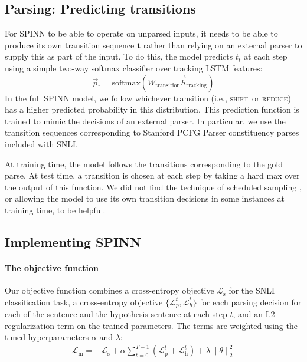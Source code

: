 \documentclass[11pt]{article}
\newcommand{\shift}{\textsc{shift}}
\newcommand{\reduce}{\textsc{reduce}}
\begin{document}
\subsection{Parsing: Predicting transitions}

For SPINN to be able to operate on unparsed inputs, it needs to be able to produce its own transition sequence $\mathbf t$ rather than relying on an external parser to supply this as part of the input. To do this, the model predicts $t_t$ at each step using a simple two-way softmax classifier over tracking LSTM features:
\begin{equation}
\vec{p}_{\text{t}} = \text{softmax}(W_{\text{transition}}\vec{h}_{\text{tracking}})
\end{equation}
In the full SPINN model, we follow whichever transition (i.e., \shift~or \reduce) has a higher predicted probability in this distribution. This prediction function is trained to mimic the decisions of an external parser. In particular, we use the transition sequences corresponding to Stanford PCFG Parser constituency parses included with SNLI.

At training time, the model follows the transitions corresponding to the gold parse. At test time, a transition is chosen at each step by taking a hard max over the output of this function. We did not find the technique of scheduled sampling \citep{bengio2015scheduled}, or allowing the model to use its own transition decisions in some instances at training time, to be helpful.

\subsection{Implementing SPINN}

\paragraph{The objective function} Our objective function combines a cross-entropy objective $\mathcal{L}_{\text{s}}$ for the SNLI classification task, a cross-entropy objective $\{\mathcal{L}_p^t, \mathcal{L}_h^t\}$ for each parsing decision for each of the sentence and the hypothesis sentence at each step $t$, and an L2 regularization term on the trained parameters. The terms are weighted using the tuned hyperparameters $\alpha$ and $\lambda$:
\begin{equation}
\begin{split}
\mathcal{L}_{\text{m}} = &\mathcal{L}_{\text{s}} + \alpha \sum_{t=0}^{T-1} (\mathcal{L}_{\text{p}}^{t} + \mathcal{L}_{\text{h}}^{t}) + \lambda \|\theta\|^2_2
\end{split}
\end{equation}
\end{document}
